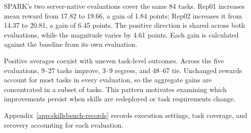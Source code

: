 SPARK's two server-native evaluations cover the same 84 tasks. Rep01 increases mean reward from 17.82 to 19.66, a gain of 1.84 points; Rep02 increases it from 14.37 to 20.81, a gain of 6.45 points. The positive direction is shared across both evaluations, while the magnitude varies by 4.61 points. Each gain is calculated against the baseline from its own evaluation.

Positive averages coexist with uneven task-level outcomes. Across the five evaluations, 9--27 tasks improve, 3--9 regress, and 48--67 tie. Unchanged rewards account for most tasks in every evaluation, so the aggregate gains are concentrated in a subset of tasks. This pattern motivates examining which improvements persist when skills are redeployed or task requirements change.

Appendix~\ref{app:skillsbench-records} records execution settings, task coverage, and recovery accounting for each evaluation.
